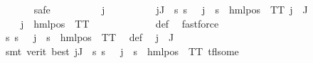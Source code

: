 \begin{isabellebody}
\ \ \ \ \ \ \isamarkupfalse%
{\isacharparenleft}{\kern0pt}safe{\isacharparenright}{\kern0pt}\isanewline
\ \ \ \ \ \ \ \ \isamarkupfalse%
\ j\isanewline
\ \ \ \ \ \ \ \ \isamarkupfalse%
\ {\isachardoublequoteopen}{\isasymforall}j{\isasymin}J{\isachardot}{\kern0pt}\ {\isasymexists}{\isasymalpha}{\isachardot}{\kern0pt}\ {\isasymforall}s{\isachardot}{\kern0pt}\ {\isacharparenleft}{\kern0pt}s\ {\isasymTurnstile}\ {\isasymPhi}\ j{\isacharparenright}{\kern0pt}\ {\isacharequal}{\kern0pt}\ {\isacharparenleft}{\kern0pt}s\ {\isasymTurnstile}\ hml{\isacharunderscore}{\kern0pt}pos\ {\isasymalpha}\ TT{\isacharparenright}{\kern0pt}{\isachardoublequoteclose}\ {\isachardoublequoteopen}j\ {\isasymin}\ J{\isachardoublequoteclose}\isanewline
\ \ \ \ \ \ \ \ \isamarkupfalse%
\ \isamarkupfalse%
\ {\isasymalpha}\ \ {\isachardoublequoteopen}{\isasymPsi}\ j\ {\isacharequal}{\kern0pt}\ hml{\isacharunderscore}{\kern0pt}pos\ {\isasymalpha}\ TT{\isachardoublequoteclose}\ \isanewline
\ \ \ \ \ \ \ \ \ \ \isamarkupfalse%
\ {\isasymPsi}{\isacharunderscore}{\kern0pt}def\ \isamarkupfalse%
\ fastforce\isanewline
\ \ \ \ \ \ \ \ \isamarkupfalse%
\ {\isachardoublequoteopen}{\isacharparenleft}{\kern0pt}{\isasymforall}s{\isachardot}{\kern0pt}\ {\isacharparenleft}{\kern0pt}s\ {\isasymTurnstile}\ {\isacharparenleft}{\kern0pt}{\isasymPhi}\ j{\isacharparenright}{\kern0pt}{\isacharparenright}{\kern0pt}\ {\isasymlongleftrightarrow}\ {\isacharparenleft}{\kern0pt}s\ {\isasymTurnstile}\ {\isacharparenleft}{\kern0pt}hml{\isacharunderscore}{\kern0pt}pos\ {\isasymalpha}\ TT{\isacharparenright}{\kern0pt}{\isacharparenright}{\kern0pt}{\isacharparenright}{\kern0pt}{\isachardoublequoteclose}\ \isamarkupfalse%
\ {\isasymPsi}{\isacharunderscore}{\kern0pt}def\ \isamarkupfalse%
\ {\isacartoucheopen}j\ {\isasymin}\ J{\isacartoucheclose}\ \isanewline
\ \ \ \ \ \ \ \ \ \ \isamarkupfalse%
\ {\isacharparenleft}{\kern0pt}smt\ {\isacharparenleft}{\kern0pt}verit{\isacharcomma}{\kern0pt}\ best{\isacharparenright}{\kern0pt}\ {\isacartoucheopen}{\isasymforall}j{\isasymin}J{\isachardot}{\kern0pt}\ {\isasymexists}{\isasymalpha}{\isachardot}{\kern0pt}\ {\isasymforall}s{\isachardot}{\kern0pt}\ {\isacharparenleft}{\kern0pt}s\ {\isasymTurnstile}\ {\isasymPhi}\ j{\isacharparenright}{\kern0pt}\ {\isacharequal}{\kern0pt}\ {\isacharparenleft}{\kern0pt}s\ {\isasymTurnstile}\ hml{\isacharunderscore}{\kern0pt}pos\ {\isasymalpha}\ TT{\isacharparenright}{\kern0pt}{\isacartoucheclose}\ tfl{\isacharunderscore}{\kern0pt}some{\isacharparenright}{\kern0pt}\isanewline

\end{isabellebody}
